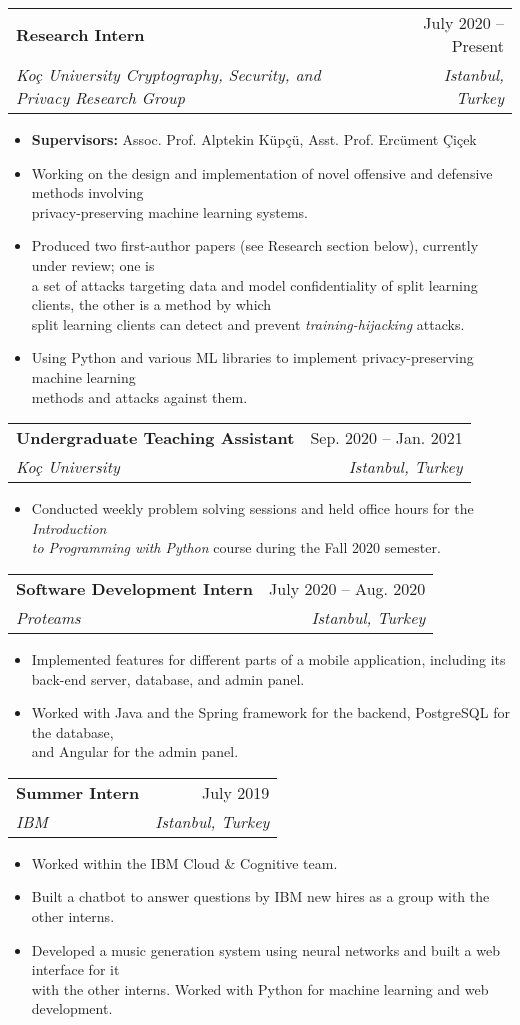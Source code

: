 \documentclass[letterpaper,11pt]{article}
\makeatletter
\newcommand{\resumeItem}[1]{
  \item\small{
    {#1 \vspace{-2pt}}
  }
}
\newcommand{\resumeSubheading}[4]{
  \vspace{-2pt}\item
    \begin{tabular*}{0.97\textwidth}[t]{l@{\extracolsep{\fill}}r}
      \textbf{#1} & #2 \\
      \textit{\small#3} & \textit{\small #4} \\
    \end{tabular*}\vspace{-7pt}
}
\newcommand{\resumeItemListStart}{
  \begin{itemize}
}
\newcommand{\resumeItemListEnd}{
  \end{itemize}\vspace{-4pt}
}
\makeatother
\begin{document}
  \resumeSubheading
    {Research Intern}{July 2020 -- Present}
    {Koç University Cryptography, Security, and Privacy Research Group}{Istanbul, Turkey}
  \resumeItemListStart
    \resumeItem{\textbf{Supervisors:} Assoc. Prof. Alptekin Küpçü, Asst. Prof. Ercüment Çiçek}
    \resumeItem{Working on the design and implementation of novel offensive and defensive methods involving \\ privacy-preserving machine learning systems.}
    \resumeItem{Produced two first-author papers (see Research section below), currently under review; one is \\ a set of attacks targeting data and model confidentiality of split learning clients, the other is a method by which \\ split learning clients can detect and prevent \textit{training-hijacking} attacks.}
    \resumeItem{Using Python and various ML libraries to implement privacy-preserving machine learning \\ methods and attacks against them. }
  \resumeItemListEnd

  \resumeSubheading
    {Undergraduate Teaching Assistant}{Sep. 2020 -- Jan. 2021}
    {Koç University}{Istanbul, Turkey}
  \resumeItemListStart
    \resumeItem{Conducted weekly problem solving sessions and held office hours for the \textit{Introduction \\ to Programming with Python} course during the Fall 2020 semester.}
  \resumeItemListEnd

  \resumeSubheading
    {Software Development Intern}{July 2020 -- Aug. 2020}
    {Proteams}{Istanbul, Turkey}
  \resumeItemListStart
    \resumeItem{Implemented features for different parts of a mobile application, including its \\ back-end server, database, and admin panel.}
    \resumeItem{Worked with Java and the Spring framework for the backend, PostgreSQL for the database, \\ and Angular for the admin panel.}
  \resumeItemListEnd

  \resumeSubheading
    {Summer Intern}{July 2019}
    {IBM}{Istanbul, Turkey}
  \resumeItemListStart
    \resumeItem{Worked within the IBM Cloud \& Cognitive team.}
    \resumeItem{Built a chatbot to answer questions by IBM new hires as a group with the other interns.}
    \resumeItem{Developed a music generation system using neural networks and built a web interface for it \\ with the other interns. Worked with Python for machine learning and web development.}
  \resumeItemListEnd
\end{document}
